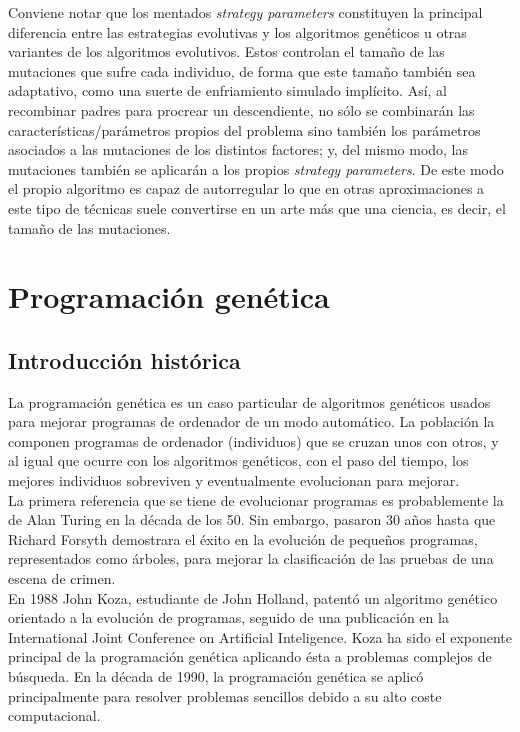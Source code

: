 \documentclass[12pt]{article} \usepackage[utf8]{inputenc}
\begin{document}
Conviene notar que los mentados \textit{strategy parameters} constituyen la principal diferencia entre las estrategias evolutivas y los algoritmos genéticos u otras variantes de los algoritmos evolutivos. Estos controlan el tamaño de las mutaciones que sufre cada individuo, de forma que este tamaño también sea adaptativo, como una suerte de enfriamiento simulado implícito. Así, al recombinar padres para procrear un descendiente, no sólo se combinarán las características/parámetros propios del problema sino también los parámetros asociados a las mutaciones de los distintos factores; y, del mismo modo, las mutaciones también se aplicarán a los propios \textit{strategy parameters}. De este modo el propio algoritmo es capaz de autorregular lo que en otras aproximaciones a este tipo de técnicas suele convertirse en un arte más que una ciencia, es decir, el tamaño de las mutaciones. \\

\section{Programación genética}


\subsection{Introducción histórica}


La programación genética es un caso particular de algoritmos genéticos
usados para mejorar programas de ordenador de un modo automático.  La
población la componen programas de ordenador (individuos) que se
cruzan unos con otros, y al igual que ocurre con los algoritmos
genéticos, con el paso del tiempo, los mejores individuos sobreviven
y eventualmente evolucionan para mejorar. \\

La primera referencia que se tiene de evolucionar programas es
probablemente la de Alan Turing en la década de los 50. Sin embargo,
pasaron 30 años hasta que Richard Forsyth demostrara el éxito en la
evolución de pequeños programas, representados como árboles,
para mejorar la clasificación de las pruebas de una escena de crimen.\\

En 1988 John Koza, estudiante de John Holland, patentó un algoritmo
genético orientado a la evolución de programas, seguido de una
publicación en la International Joint Conference on Artificial
Inteligence. Koza ha sido el exponente principal de la programación
genética aplicando ésta a problemas complejos de búsqueda.
En la década de 1990, la programación genética se aplicó
principalmente para resolver problemas sencillos debido a su alto
coste computacional.\\
\end{document}
